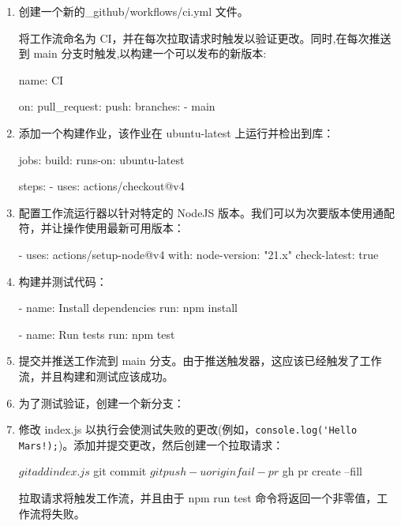 \begin{enumerate}
\item 
创建一个新的\_github/workflows/ci.yml 文件。

将工作流命名为 CI，并在每次拉取请求时触发以验证更改。同时,在每次推送到 main 分支时触发,以构建一个可以发布的新版本:

\begin{shell}
name: CI

on:
  pull_request:
  push:
    branches:
      - main
\end{shell}

\item 
添加一个构建作业，该作业在 ubuntu-latest 上运行并检出到库：

\begin{shell}
jobs:
  build:
    runs-on: ubuntu-latest

    steps:
      - uses: actions/checkout@v4
\end{shell}

\item 
配置工作流运行器以针对特定的 NodeJS 版本。我们可以为次要版本使用通配符，并让操作使用最新可用版本：

\begin{shell}
- uses: actions/setup-node@v4
  with:
    node-version: "21.x"
    check-latest: true
\end{shell}

\item 
构建并测试代码：

\begin{shell}
- name: Install dependencies
  run: npm install

- name: Run tests
  run: npm test
\end{shell}

\item 
提交并推送工作流到 main 分支。由于推送触发器，这应该已经触发了工作流，并且构建和测试应该成功。

\item 
为了测试验证，创建一个新分支：


\item 
修改 index.js 以执行会使测试失败的更改(例如，\verb|console.log('Hello Mars!);|)。添加并提交更改，然后创建一个拉取请求：

\begin{shell}
$ git add index.js
$ git commit
$ git push -u origin fail-pr
$ gh pr create --fill
\end{shell}

拉取请求将触发工作流，并且由于 npm run test 命令将返回一个非零值，工作流将失败。

\end{enumerate}

